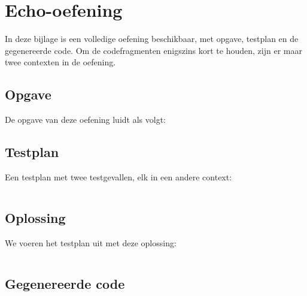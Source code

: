 \chapter{Echo-oefening}\label{ch:echo-oefening}

In deze bijlage is een volledige oefening beschikbaar, met opgave, testplan en de gegenereerde code.
Om de codefragmenten enigszins kort te houden, zijn er maar twee contexten in de oefening.

\section{Opgave}\label{sec:echo-opgave}

De opgave van deze oefening luidt als volgt:

\begin{quote}
\end{quote}

\section{Testplan}\label{sec:echo-testplan}

Een testplan met twee testgevallen, elk in een andere context:

\inputminted{json}{../../exercise/echo/evaluation/two.tson}

\section{Oplossing}\label{sec:echo-oplossing}

We voeren het testplan uit met deze oplossing:

\inputminted{c}{../../exercise/echo/solution/correct.c}

\section{Gegenereerde code}\label{sec:echo-gegenereerde-code}

